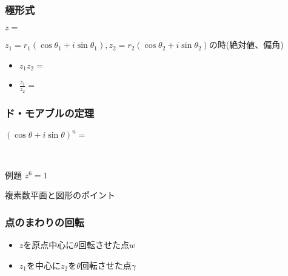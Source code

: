 \documentclass[10pt,dvipdfmx]{jsarticle}
\begin{document}
\subsubsection*{極形式}
\begin{LARGE}
  $z=$\\
\end{LARGE}
$z_1=r_1(\cos\theta_1+i\sin\theta_1), z_2=r_2(\cos\theta_2+i\sin\theta_2)$の時(絶対値、偏角)
\begin{Large}
  \begin{itemize}
    \item $z_1z_2=$
    \item $\frac{z_1}{z_2}=$
  \end{itemize}
\end{Large}

\subsubsection*{ド・モアブルの定理}
\begin{large}
  $(\cos\theta+i\sin\theta)^n=$
\end{large}\\

\begin{itembox}[l]{例題}
  $z^6=1$
  \vspace{15mm}
\end{itembox}

\newpage
\begin{itembox}[l]{複素数平面と図形のポイント}
  \vspace{10mm}
\end{itembox}

\subsubsection*{点のまわりの回転}
\begin{large}
  \begin{itemize}
    \item $z$を原点中心に$\theta$回転させた点$w$
    \item $z_1$を中心に$z_2$を$\theta$回転させた点$\gamma$
  \end{itemize}
\end{large}
\end{document}
